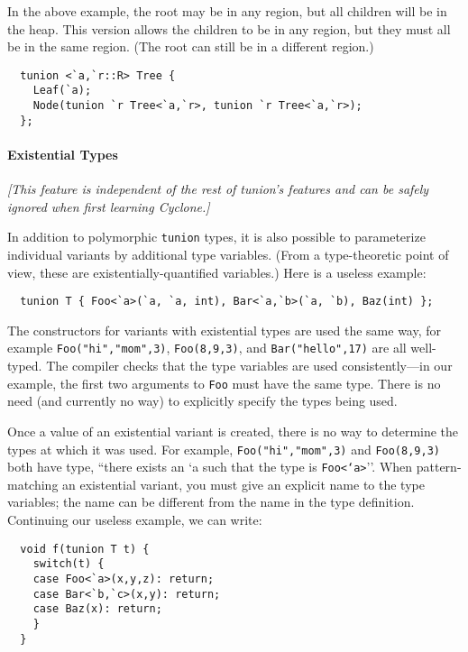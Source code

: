 In the above example, the root may be in any region, but all children
will be in the heap.  This version allows the children to be in any
region, but they must all be in the same region.  (The root can still
be in a different region.)

\begin{verbatim}
  tunion <`a,`r::R> Tree {
    Leaf(`a);
    Node(tunion `r Tree<`a,`r>, tunion `r Tree<`a,`r>);
  };
\end{verbatim}

\paragraph{Existential Types} \textit{[This feature is independent of
  the rest of tunion's features and can be safely ignored when first
  learning Cyclone.]}

In addition to polymorphic \texttt{tunion} types, it is also possible to
parameterize individual variants by additional type variables.  (From
a type-theoretic point of view, these are existentially-quantified
variables.)  Here is a useless example:

\begin{verbatim}
  tunion T { Foo<`a>(`a, `a, int), Bar<`a,`b>(`a, `b), Baz(int) };
\end{verbatim}

The constructors for variants with existential types are used the same
way, for example \texttt{Foo("hi","mom",3)}, \texttt{Foo(8,9,3)}, and
\texttt{Bar("hello",17)} are all well-typed.  The compiler checks that
the type variables are used consistently---in our example, the first
two arguments to \texttt{Foo} must have the same type.  There is no need
(and currently no way) to explicitly specify the types being used.

Once a value of an existential variant is created, there is no way to
determine the types at which it was used.  For example,
\texttt{Foo("hi","mom",3)} and \texttt{Foo(8,9,3)} both have type, ``there
exists an `a such that the type is \texttt{Foo<`a>}''.  When
pattern-matching an existential variant, you must give an explicit
name to the type variables; the name can be different from the name in
the type definition.  Continuing our useless example, we can write:
\begin{verbatim}
  void f(tunion T t) {
    switch(t) {
    case Foo<`a>(x,y,z): return;
    case Bar<`b,`c>(x,y): return;
    case Baz(x): return;
    }
  }
\end{verbatim}

